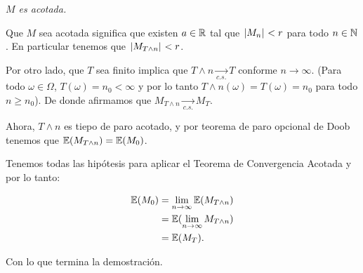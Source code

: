 \emph{
    $M$ es acotada.
}

\afterstatement\par\null

Que $M$ sea acotada significa que existen $a \in  \mathbb{R}$ tal que $\hspace{.25mm}\left|M_n\right|\hspace{.25mm} < r$ para todo $n \in \mathbb{N}$. En particular 
tenemos que $\hspace{.25mm}\left|M_{T \wedge n}\right|\hspace{.25mm} < r$.\par\null

Por otro lado, que $T$ sea finito implica que $T \wedge n  \underset{c.s.}\longrightarrow T$ conforme $n \rightarrow \infty$.
(Para todo $\omega \in \Omega$, $T(\omega) = n_0 < \infty$ y por lo tanto $T \wedge n (\omega) = T(\omega) = n_0$ para todo
$n \geq n_0$). De donde afirmamos que $M_{T \wedge n} \underset{c.s.}\longrightarrow M_T$. \par\null

Ahora, $T \wedge n$ es tiepo de paro acotado, y por teorema de paro opcional de Doob tenemos que 
$\mathbb{E}(M_{T \wedge n}) = \mathbb{E}(M_0)$.\par\null

Tenemos todas las hipótesis para aplicar el Teorema de Convergencia Acotada y por lo tanto:

\begin{align}
    \mathbb{E}(M_0)     &=  \lim_{n \rightarrow \infty} \mathbb{E}(M_{T \wedge n})     \\
                &=  \mathbb{E}(\lim_{n \rightarrow \infty} M_{T \wedge n})     \\
                &=  \mathbb{E}(M_T).
\end{align}\par\null

Con lo que termina la demostración.
 